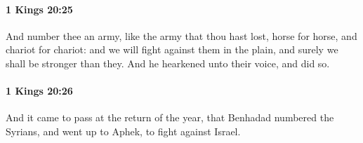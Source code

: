		\paragraph{1 Kings 20:25} %
			\label{1KINGS-20-25}

			And number thee an army, like the army that thou hast lost, horse for horse, and chariot for chariot: and we will fight against them in the plain, and surely we shall be stronger than they. And he hearkened unto their voice, and did so.


		\paragraph{1 Kings 20:26} %
			\label{1KINGS-20-26}

			And it came to pass at the return of the year, that Benhadad numbered the Syrians, and went up to Aphek, to fight against Israel.


